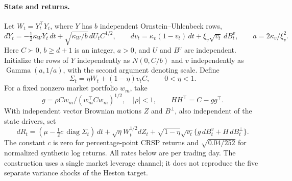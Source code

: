 \documentclass[11pt]{article}
\theoremstyle{definition}\newtheorem{definition}[theorem]{Definition}
\theoremstyle{remark}\newtheorem{remark}[theorem]{Remark}
\begin{document}
\paragraph{State and returns.}
Let $W_t=Y_t^\top Y_t$, where $Y$ has $b$ independent Ornstein--Uhlenbeck rows,
\[
 dY_t=-\tfrac12\kappa_W Y_t\,dt+\sqrt{\kappa_W/b}\,dU_t C^{1/2},
 \qquad dv_t=\kappa_v(1-v_t)\,dt+\xi_v\sqrt{v_t}\,dB_t^v,
 \qquad a=2\kappa_v/\xi_v^2.
\]
Here $C\succ0$, $b\ge d+1$ is an integer, $a>0$, and $U$ and $B^v$ are independent. Initialize the rows of $Y$ independently as $N(0,C/b)$ and $v$ independently as $\operatorname{Gamma}(a,1/a)$, with the second argument denoting scale. Define
\begin{equation}\label{eq:wc-sigma}
 \Sigma_t=\eta W_t+(1-\eta)v_t C,\qquad 0<\eta<1.
\end{equation}
For a fixed nonzero market portfolio $w_m$, take
\[
 g=\rho Cw_m/(w_m^\top Cw_m)^{1/2},\quad |\rho|<1,
 \qquad HH^\top=C-gg^\top.
\]
With independent vector Brownian motions $Z$ and $B^\perp$, also independent of the state drivers, set
\begin{equation}\label{eq:wc-return}
 dR_t=(\mu-\tfrac12 c\,\operatorname{diag}\Sigma_t)\,dt
 +\sqrt\eta W_t^{1/2}dZ_t
 +\sqrt{1-\eta}\sqrt{v_t}\{g\,dB_t^v+H\,dB_t^\perp\}.
\end{equation}
The constant $c$ is zero for percentage-point CRSP returns and $\sqrt{0.04/252}$ for normalized synthetic log returns. All rates below are per trading day. The construction uses a single market leverage channel; it does not reproduce the five separate variance shocks of the Heston target.
\end{document}
